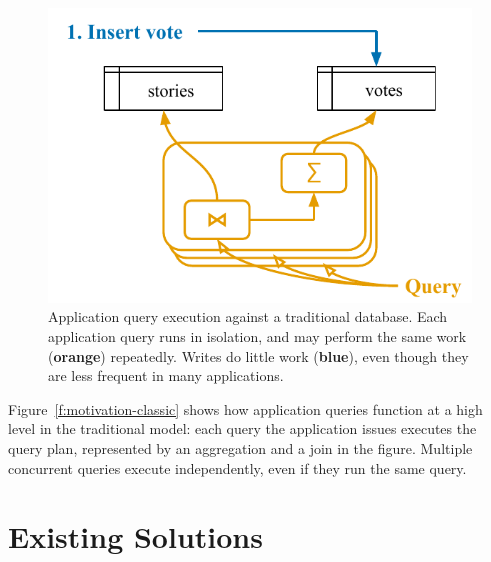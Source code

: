 \begin{figure}
  \centering
  \includegraphics{diagrams/Motivation Classic DB.pdf}
  \caption{Application query execution against a traditional database. Each
  application query runs in isolation, and may perform the same work
  (\textbf{\color{set2}orange}) repeatedly. Writes do little work
  (\textbf{\color{set1}blue}), even though they are less frequent in many
  applications.}
  \label{f:motivation-classic}
\end{figure}

Figure~\vref{f:motivation-classic} shows how application queries function at a
high level in the traditional model: each query the application issues executes
the query plan, represented by an aggregation and a join in the figure. Multiple
concurrent queries execute independently, even if they run the same query.

\section{Existing Solutions}
\label{s:existing}


